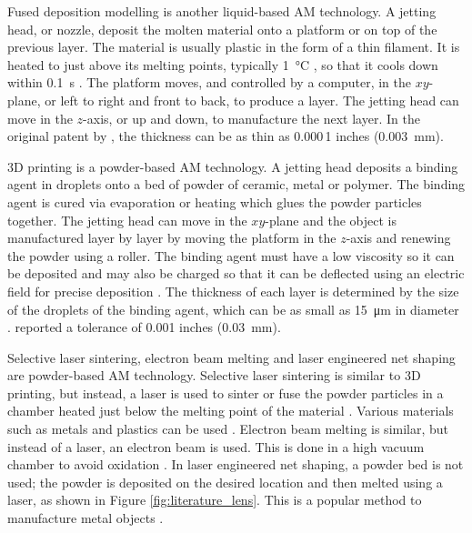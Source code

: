 Fused deposition modelling is another liquid-based AM technology. A jetting head, or nozzle, deposit the molten material onto a platform or on top of the previous layer. The material is usually plastic in the form of a thin filament. It is heated to just above its melting points, typically \SI{1}{\degreeCelsius} \citep{crump1992apparatus}, so that it cools down within \SI{0.1}{\second} \citep{kruth1991material}. The platform moves, and controlled by a computer, in the $xy$-plane, or left to right and front to back, to produce a layer. The jetting head can move in the $z$-axis, or up and down, to manufacture the next layer. In the original patent by \cite{crump1992apparatus}, the thickness can be as thin as 0.000\,1 inches (\SI{0.003}{\milli\metre}).

3D printing is a powder-based AM technology. A jetting head deposits a binding agent in droplets onto a bed of powder of ceramic, metal or polymer. The binding agent is cured via evaporation or heating which glues the powder particles together. The jetting head can move in the $xy$-plane and the object is manufactured layer by layer by moving the platform in the $z$-axis and renewing the powder using a roller. The binding agent must have a low viscosity so it can be deposited and may also be charged so that it can be deflected using an electric field for precise deposition \citep{sachs1990three}. The thickness of each layer is determined by the size of the droplets of the binding agent, which can be as small as \SI{15}{\micro\metre} in diameter \citep{sachs1990three}. \cite{sachs1990three} reported a tolerance of 0.001 inches (\SI{0.03}{\milli\metre}).

Selective laser sintering, electron beam melting and laser engineered net shaping are powder-based AM technology. Selective laser sintering is similar to 3D printing, but instead, a laser is used to sinter or fuse the powder particles in a chamber heated just below the melting point of the material \citep{wong2012review}. Various materials such as metals and plastics can be used \citep{wong2012review}. Electron beam melting is similar, but instead of a laser, an electron beam is used. This is done in a high vacuum chamber to avoid oxidation \citep{wong2012review}. In laser engineered net shaping, a powder bed is not used; the powder is deposited on the desired location and then melted using a laser, as shown in Figure \ref{fig:literature_lens}. This is a popular method to manufacture metal objects \citep{gibson2010additive}.

